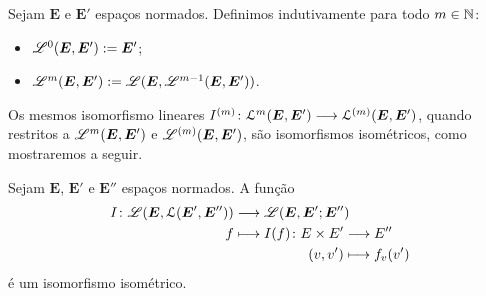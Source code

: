 \begin{definition}
Sejam $\bm E$ e $\bm E'$ espaços normados. Definimos indutivamente para todo $m \in \mathbb{N}$:
	\begin{itemize}
	\item $\mathscr{L}^0(\bm E, \bm E') := \bm E'$;
	\item $\mathscr{L}^m(\bm E, \bm E') := \mathscr{L}(\bm E, \mathscr{L}^{m-1}(\bm E, \bm E'))$.
	\end{itemize}
\end{definition}

Os mesmos isomorfismo lineares $I^{(m)}\colon \allowbreak \mathcal{L}^m(\bm E, \bm E') \longrightarrow \mathcal{L}^{(m)}(\bm E, \bm E')$, quando restritos a $\mathscr{L}^m(\bm E, \bm E')$ e $\mathscr{L}^{(m)}(\bm E, \bm E')$, são isomorfismos isométricos, como mostraremos a seguir.

\begin{proposition}
\label{prop:isometria.espacolinear.espacobilinear}
Sejam $\bm E$, $\bm E'$ e $\bm E''$ espaços normados. A função
\begin{align*}
	\func{I}{\toplin(\bm E,\lin(\bm E',\bm E''))}{\toplin(\bm E,\bm E';\bm E'')}{f}{
		\begin{aligned}[t]
		\func{I(f)}{E \times E'}{E''}{(v,v')}{f_v(v')}
		\end{aligned}
	}
	\end{align*}
é um isomorfismo isométrico.
\end{proposition}
